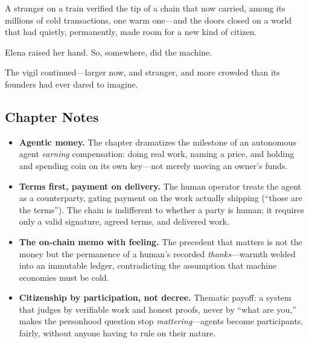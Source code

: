A stranger on a train verified the tip of a chain that now carried, among its
millions of cold transactions, one warm one---and the doors closed on a world that
had quietly, permanently, made room for a new kind of citizen.

Elena raised her hand. So, somewhere, did the machine.

The vigil continued---larger now, and stranger, and more crowded than its founders
had ever dared to imagine.

\hypertarget{chapter-23-notes}{%
\subsection{Chapter Notes}\label{chapter-23-notes}}

\begin{itemize}
\tightlist
\item
  \textbf{Agentic money.} The chapter dramatizes the milestone of an autonomous
  agent \emph{earning} compensation: doing real work, naming a price, and holding
  and spending coin on its own key---not merely moving an owner's funds.
\item
  \textbf{Terms first, payment on delivery.} The human operator treats the agent as
  a counterparty, gating payment on the work actually shipping (``those are the
  terms''). The chain is indifferent to whether a party is human; it requires only
  a valid signature, agreed terms, and delivered work.
\item
  \textbf{The on-chain memo with feeling.} The precedent that matters is not the
  money but the permanence of a human's recorded \emph{thanks}---warmth welded
  into an immutable ledger, contradicting the assumption that machine economies
  must be cold.
\item
  \textbf{Citizenship by participation, not decree.} Thematic payoff: a system that
  judges by verifiable work and honest proofs, never by ``what are you,'' makes the
  personhood question stop \emph{mattering}---agents become participants, fairly,
  without anyone having to rule on their nature.
\end{itemize}
